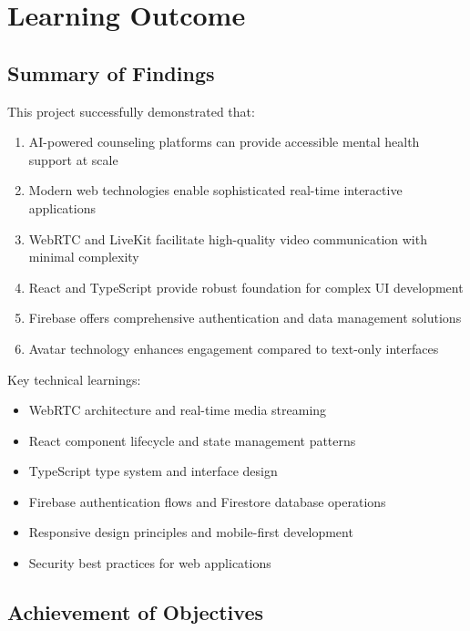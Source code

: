 \documentclass[11pt,a4paper]{article}
\begin{document}
\newpage

\section{Learning Outcome}

\subsection{Summary of Findings}

This project successfully demonstrated that:

\begin{enumerate}
    \item AI-powered counseling platforms can provide accessible mental health support at scale
    \item Modern web technologies enable sophisticated real-time interactive applications
    \item WebRTC and LiveKit facilitate high-quality video communication with minimal complexity
    \item React and TypeScript provide robust foundation for complex UI development
    \item Firebase offers comprehensive authentication and data management solutions
    \item Avatar technology enhances engagement compared to text-only interfaces
\end{enumerate}

Key technical learnings:
\begin{itemize}
    \item WebRTC architecture and real-time media streaming
    \item React component lifecycle and state management patterns
    \item TypeScript type system and interface design
    \item Firebase authentication flows and Firestore database operations
    \item Responsive design principles and mobile-first development
    \item Security best practices for web applications
\end{itemize}

\subsection{Achievement of Objectives}
\end{document}
